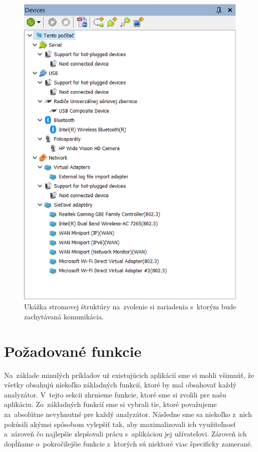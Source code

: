 \begin{figure}[!htb]
	\centering
	\includegraphics[width=\textwidth]{img/uvod_treeview}
	\caption{Ukážka stromovej štruktúry na~zvolenie si zariadenia s~ktorým bude zachytávaná komunikácia.}
	\label{obr:uvod:treeview_foto}
\end{figure}

\section{Požadované funkcie}
Na~základe minulých príkladov už existujúcich aplikácií sme si mohli všimnúť, že všetky obsahujú niekoľko základných funkcií, ktoré by mal obsahovať každý analyzátor. V~tejto sekcii zhrnieme funkcie, ktoré sme si zvolili pre našu aplikáciu. Zo~základných funkcií sme si vybrali tie, ktoré považujeme za~absolútne nevyhnutné pre každý analyzátor. Následne sme sa niekoľko z~nich pokúsili akýmsi spôsobom vylepšiť tak, aby maximalizovali ich využiteľnosť a~zároveň čo najlepšie zlepšovali prácu s~aplikáciou jej užívateľovi. Zároveň ich dopĺňame o~pokročilejšie funkcie z~ktorých sú niektoré viac špecificky zamerané.

